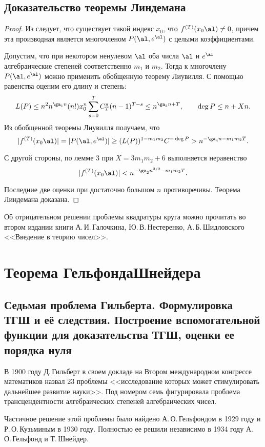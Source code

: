 \documentclass{article}
\begin{document}
\subsection{Доказательство теоремы Линдемана}

\begin{proof}
Из  следует, что существует
такой индекс $x_0$, что $f^{(T)}(x_0\al) \ne 0$, причем эта производная является
многочленом $P(\al,e^{\al})$ с целыми коэффициентами.

Допустим, что при некотором ненулевом
$\al$     оба числа $\al$  и $e^{\al}$  алгебраические степеней
соответственно $m_1$ и  $m_2$. Тогда
к многочлену $P(\al, e^{\al}) $ можно применить обобщенную теорему
Лиувилля. С помощью равенства  оценим его длину и степень:
$$
L(P) \le n^2n^{\ga_1n}(n!)x_0^n\sum_{s=0}^TC_T^s(n-1)^{T-s} \le
n^{\ga_3n+T}, \qquad \deg P \le n+Xn.
$$
Из обобщенной теоремы Лиувилля получаем, что
$$
|f^{(T)}(x_0\al)|=|P(\al, e^{\al})|\ge (L(P))^{1-m_1m_2}C^{-\deg P} >
n^{-\ga_4n-m_1m_2T}.
$$

С другой стороны, по лемме 3 при $X=3m_1m_2+6$ выполняется неравенство
$$
|f^{(T)}(x_0\al)| <n^{-\ga_2n^{3/2}-m_1m_2T}.
$$

Последние две оценки при достаточно большом $n$ противоречивы. Теорема
Линдемана  доказана.
\end{proof}

Об отрицательном решении проблемы квадратуры круга можно прочитать во
втором издании книги А.\,И.\,Га\-лочкина, Ю.\,В.\,Нестеренко, А.\,Б.\,Шидловского
<<Введение в теорию чисел>>.

\section{Теорема Гельфонда\ч Шнейдера}

\subsection{Седьмая проблема Гильберта. Формулировка ТГШ и её следствия.
Построение вспомогательной функции для доказательства ТГШ, оценки ее порядка нуля}

В 1900 году Д.\,Гильберт в своем докладе на Втором международном конгрессе
математиков назвал 23 проблемы <<исследование которых может стимулировать
дальнейшее развитие науки>>. Под номером семь фигурировала проблема
трансцендентности алгебраических степеней алгебраических чисел.

Частичное решение этой проблемы было найдено А.\,О.\,Гельфондом в 1929 году и
Р.\,О.\,Кузьминым в 1930 году. Полностью ее решили независимо в 1934 году
А.\,О.\,Гельфонд и Т.\,Шнейдер.
\end{document}
